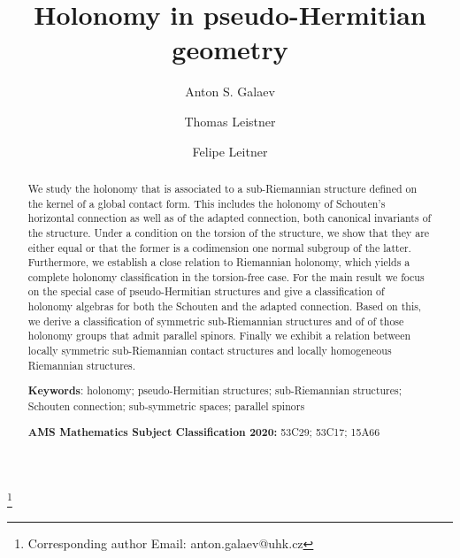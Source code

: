 \documentclass{amsart}
\theoremstyle{plain}
\theoremstyle{definition}
\newcommand{\1}{\mathbf{1}}
\newcommand{\+}{\oplus}
\begin{document}
	
	\title{Holonomy in pseudo-Hermitian geometry}
\setlength{\footskip}{.8cm}	
	
	\author[Anton S. Galaev]{Anton S. Galaev}
	\thanks{Corresponding author Email: anton.galaev@uhk.cz}
	\address[Galaev]{University of Hradec Kr\'alov\'e, Faculty of Science, Department of Mathematics, Rokitansk\'eho 62, 500~03 Hradec Kr\'alov\'e, Czech Republic}
	
	
	\author[Thomas Leistner]{Thomas Leistner}\address[Leistner]{School of Computer and Mathematical Sciences, University of Adelaide, SA~5005, Australia}
	
	
	\author[Felipe Leitner]{Felipe Leitner}\address[Leitner]{Institut f\"ur Mathematik und Informatik, Walther-Rathenau-Str. 47, 17489 Greifswald, Germany}
	
	
	
	\begin{abstract}
We study the holonomy that is associated to a sub-Riemannian  structure defined 
 on the kernel of a global contact form. This includes the holonomy of  Schouten's horizontal connection as well as of the adapted connection, both canonical invariants of the structure.  	Under a condition on the torsion of the structure, we show that they are either equal or that the former is a codimension one normal subgroup of the latter. Furthermore, we establish a close relation to Riemannian holonomy, which yields a complete holonomy classification in the torsion-free case. For the main result we focus on the special case of pseudo-Hermitian structures and give a classification of holonomy algebras for both the Schouten and the adapted connection. Based on this, we derive a classification of symmetric sub-Riemannian structures and of of those holonomy groups that admit parallel spinors. Finally we exhibit a relation between locally symmetric sub-Riemannian contact structures and locally homogeneous Riemannian structures.
	

		
\medskip
		
		{\bf Keywords}: holonomy; pseudo-Hermitian structures;  sub-Riemannian structures; Schouten connection; sub-symmetric spaces; parallel spinors

\medskip
		
		{\bf AMS Mathematics Subject Classification 2020:} 53C29; 53C17; 15A66 
		
		
	\end{abstract}
	
\end{document}

